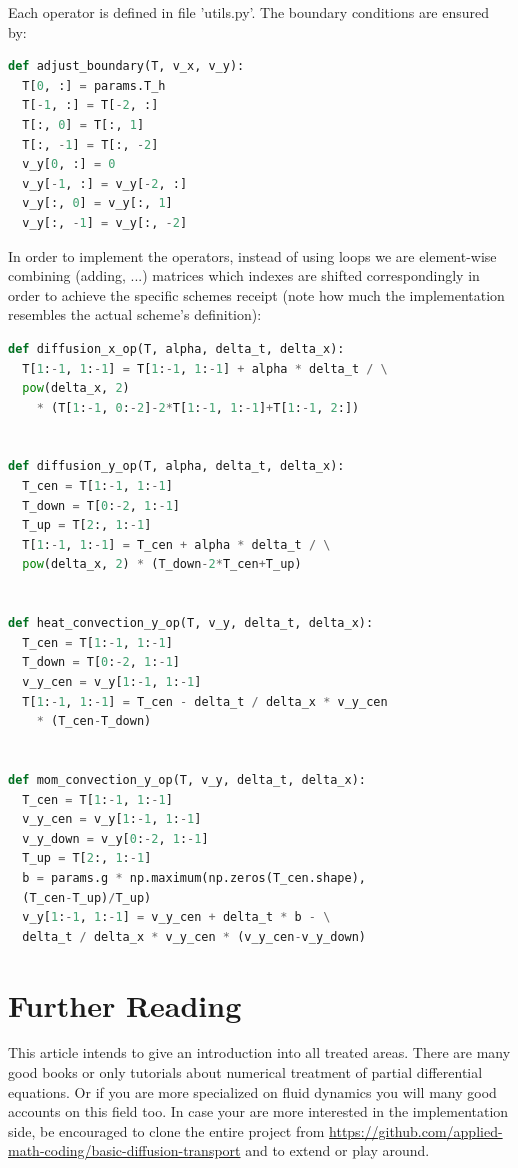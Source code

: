 \documentclass[]{article}
\begin{document}
Each operator is defined in file 'utils.py'.
The boundary conditions are ensured by:
\begin{lstlisting}[language=Python]
def adjust_boundary(T, v_x, v_y):
  T[0, :] = params.T_h
  T[-1, :] = T[-2, :]
  T[:, 0] = T[:, 1]
  T[:, -1] = T[:, -2]
  v_y[0, :] = 0
  v_y[-1, :] = v_y[-2, :]
  v_y[:, 0] = v_y[:, 1]
  v_y[:, -1] = v_y[:, -2]
\end{lstlisting}

In order to implement the operators, instead of using loops we are element-wise combining (adding, ...) matrices which indexes are shifted correspondingly in order to achieve the 
specific schemes receipt (note how much the implementation resembles the actual scheme's definition):
\begin{lstlisting}[language=Python]
def diffusion_x_op(T, alpha, delta_t, delta_x):
  T[1:-1, 1:-1] = T[1:-1, 1:-1] + alpha * delta_t / \
  pow(delta_x, 2)
    * (T[1:-1, 0:-2]-2*T[1:-1, 1:-1]+T[1:-1, 2:])


def diffusion_y_op(T, alpha, delta_t, delta_x):
  T_cen = T[1:-1, 1:-1]
  T_down = T[0:-2, 1:-1]
  T_up = T[2:, 1:-1]
  T[1:-1, 1:-1] = T_cen + alpha * delta_t / \
  pow(delta_x, 2) * (T_down-2*T_cen+T_up)


def heat_convection_y_op(T, v_y, delta_t, delta_x):
  T_cen = T[1:-1, 1:-1]
  T_down = T[0:-2, 1:-1]
  v_y_cen = v_y[1:-1, 1:-1]
  T[1:-1, 1:-1] = T_cen - delta_t / delta_x * v_y_cen
    * (T_cen-T_down)


def mom_convection_y_op(T, v_y, delta_t, delta_x):
  T_cen = T[1:-1, 1:-1]
  v_y_cen = v_y[1:-1, 1:-1]
  v_y_down = v_y[0:-2, 1:-1]
  T_up = T[2:, 1:-1]
  b = params.g * np.maximum(np.zeros(T_cen.shape),
  (T_cen-T_up)/T_up)
  v_y[1:-1, 1:-1] = v_y_cen + delta_t * b - \
  delta_t / delta_x * v_y_cen * (v_y_cen-v_y_down)
\end{lstlisting}

\section{Further Reading}
This article intends to give an introduction into all treated areas.
There are many good books or only tutorials about numerical treatment of partial
differential equations. Or if you are more specialized on fluid dynamics you will
many good accounts on this field too. In case your are more interested in the 
implementation side, be encouraged to clone the entire project from
\url{https://github.com/applied-math-coding/basic-diffusion-transport} and to extend or play around.
\end{document}
